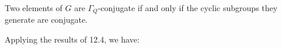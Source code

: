 Two elements of $G$ are $\Gamma_Q$-conjugate if and only if the cyclic subgroups they generate are conjugate.

Applying the results of 12.4, we have:
